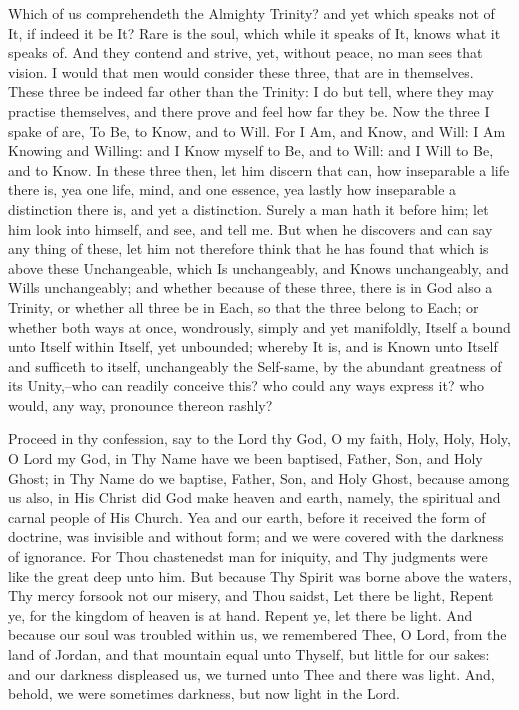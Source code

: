 \documentclass[b5paper,openright,12pt,twoside]{book}
\begin{document}
Which of us comprehendeth the Almighty Trinity? and yet which speaks not
of It, if indeed it be It? Rare is the soul, which while it speaks of
It, knows what it speaks of. And they contend and strive, yet, without
peace, no man sees that vision. I would that men would consider these
three, that are in themselves. These three be indeed far other than the
Trinity: I do but tell, where they may practise themselves, and there
prove and feel how far they be. Now the three I spake of are, To Be,
to Know, and to Will. For I Am, and Know, and Will: I Am Knowing and
Willing: and I Know myself to Be, and to Will: and I Will to Be, and to
Know. In these three then, let him discern that can, how inseparable
a life there is, yea one life, mind, and one essence, yea lastly how
inseparable a distinction there is, and yet a distinction. Surely a man
hath it before him; let him look into himself, and see, and tell me. But
when he discovers and can say any thing of these, let him not therefore
think that he has found that which is above these Unchangeable, which
Is unchangeably, and Knows unchangeably, and Wills unchangeably; and
whether because of these three, there is in God also a Trinity, or
whether all three be in Each, so that the three belong to Each; or
whether both ways at once, wondrously, simply and yet manifoldly, Itself
a bound unto Itself within Itself, yet unbounded; whereby It is, and is
Known unto Itself and sufficeth to itself, unchangeably the Self-same,
by the abundant greatness of its Unity,--who can readily conceive this?
who could any ways express it? who would, any way, pronounce thereon
rashly?

Proceed in thy confession, say to the Lord thy God, O my faith, Holy,
Holy, Holy, O Lord my God, in Thy Name have we been baptised, Father,
Son, and Holy Ghost; in Thy Name do we baptise, Father, Son, and Holy
Ghost, because among us also, in His Christ did God make heaven and
earth, namely, the spiritual and carnal people of His Church. Yea and
our earth, before it received the form of doctrine, was invisible and
without form; and we were covered with the darkness of ignorance. For
Thou chastenedst man for iniquity, and Thy judgments were like the great
deep unto him. But because Thy Spirit was borne above the waters, Thy
mercy forsook not our misery, and Thou saidst, Let there be light,
Repent ye, for the kingdom of heaven is at hand. Repent ye, let there be
light. And because our soul was troubled within us, we remembered Thee,
O Lord, from the land of Jordan, and that mountain equal unto Thyself,
but little for our sakes: and our darkness displeased us, we turned unto
Thee and there was light. And, behold, we were sometimes darkness, but
now light in the Lord.
\end{document}
